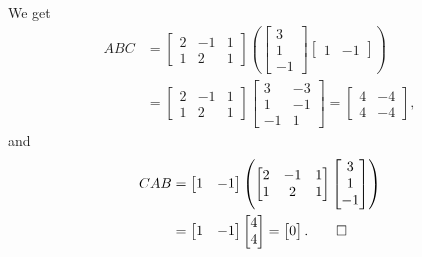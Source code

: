 \begin{solution}
  We get
  \begin{align*}
    ABC
    &=
    \begin{bmatrix}
      2 & -1 & 1 \\
      1 & 2 & 1
    \end{bmatrix}
    \left(
      \begin{bmatrix}
        3 \\
        1 \\
        -1
      \end{bmatrix}
      \begin{bmatrix}
        1 & -1
      \end{bmatrix}
    \right) \\
    &=
    \begin{bmatrix}
      2 & -1 & 1 \\
      1 & 2 & 1
    \end{bmatrix}
    \begin{bmatrix}
      3 & -3 \\
      1 & -1 \\
      -1 & 1
    \end{bmatrix}
    =
    \begin{bmatrix}
      4 & -4 \\
      4 & -4
    \end{bmatrix},
  \end{align*}
  and
  \begin{align*}
    CAB
    &=
    \begin{bmatrix}
      1 & -1
    \end{bmatrix}
    \left(
      \begin{bmatrix}
        2 & -1 & 1 \\
        1 & 2 & 1
      \end{bmatrix}
      \begin{bmatrix}
        3 \\
        1 \\
        -1
      \end{bmatrix}
    \right) \\
    &=
    \begin{bmatrix}
      1 & -1
    \end{bmatrix}
    \begin{bmatrix}
      4 \\
      4
    \end{bmatrix}
    =
    \begin{bmatrix}
      0
    \end{bmatrix}. \qedhere
  \end{align*}
\end{solution}


